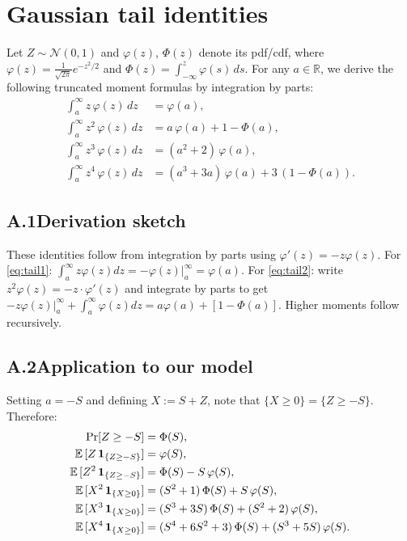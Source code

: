 
\setcounter{equation}{0}
\renewcommand{\theequation}{\Alph{section}.\arabic{equation}}
\setcounter{lemma}{0}
\renewcommand{\thelemma}{\Alph{section}.\arabic{lemma}}
\setcounter{proposition}{0}
\renewcommand{\theproposition}{\Alph{section}.\arabic{proposition}}

\section{Gaussian tail identities}
\label{app:tails}
Let $Z\sim\mathcal N(0,1)$ and $\varphi(z)$, $\Phi(z)$ denote its pdf/cdf, where $\varphi(z)=\frac{1}{\sqrt{2\pi}}e^{-z^2/2}$ and $\Phi(z)=\int_{-\infty}^z \varphi(s)\,ds$. For any $a\in\mathbb R$, we derive the following truncated moment formulas by integration by parts:
\begin{align}
\int_a^{\infty} z\,\varphi(z)\,dz &= \varphi(a),\label{eq:tail1}\\
\int_a^{\infty} z^2\,\varphi(z)\,dz &= a\,\varphi(a) + 1-\Phi(a),\label{eq:tail2}\\
\int_a^{\infty} z^3\,\varphi(z)\,dz &= (a^2+2)\,\varphi(a),\label{eq:tail3}\\
\int_a^{\infty} z^4\,\varphi(z)\,dz &= (a^3+3a)\,\varphi(a) + 3\,(1-\Phi(a)).\label{eq:tail4}
\end{align}

\subsection*{A.1\quad Derivation sketch}
These identities follow from integration by parts using $\varphi'(z)=-z\varphi(z)$. For \eqref{eq:tail1}: $\int_a^\infty z\varphi(z)dz = -\varphi(z)\big|_a^\infty = \varphi(a)$. For \eqref{eq:tail2}: write $z^2\varphi(z)=-z\cdot\varphi'(z)$ and integrate by parts to get $-z\varphi(z)\big|_a^\infty + \int_a^\infty\varphi(z)dz = a\varphi(a) + [1-\Phi(a)]$. Higher moments follow recursively.

\subsection*{A.2\quad Application to our model}
Setting $a=-S$ and defining $X:=S+Z$, note that $\{X\ge 0\} = \{Z \ge -S\}$. Therefore:
\begin{align}
\Pr[Z\ge -S] &= \Phi(S),\\
{\mathbb{E}}\,[Z\,\mathbf 1_{\{Z\ge -S\}}] &= \varphi(S),\\
{\mathbb{E}}\,[Z^2\,\mathbf 1_{\{Z\ge -S\}}] &= \Phi(S) - S\,\varphi(S),\\
{\mathbb{E}}\,[X^2\,\mathbf 1_{\{X\ge 0\}}] &= (S^2+1)\,\Phi(S) + S\,\varphi(S),\\
{\mathbb{E}}\,[X^3\,\mathbf 1_{\{X\ge 0\}}] &= (S^3+3S)\,\Phi(S) + (S^2+2)\,\varphi(S),\\
{\mathbb{E}}\,[X^4\,\mathbf 1_{\{X\ge 0\}}] &= (S^4+6S^2+3)\,\Phi(S) + (S^3+5S)\,\varphi(S).
\end{align}

